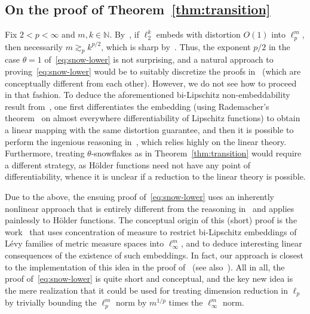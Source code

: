 \documentclass[11pt,reqno]{amsart}
\newcommand{\N}{\mathbb{N}}
\newcommand{\1}{\mathbf{1}}
\begin{document}
  
\subsection{On the proof of Theorem~\ref{thm:transition}} Fix $2<p<\infty$ and $m,k\in \N$. By~\cite{PR75,BDGJN77}, if $\ell_2^k$ embeds with distortion $O(1)$ into $\ell_p^m$, then necessarily $m\gtrsim_p k^{p/2}$, which is sharp by~\cite{FLM}. Thus, the exponent $p/2$ in the case $\theta=1$ of~\eqref{eq:snow-lower} is not surprising, and a natural approach to proving~\eqref{eq:snow-lower} would be to suitably discretize the proofs in~\cite{PR75,BDGJN77} (which are conceptually different from each other). However, we do not see how to proceed in that fashion.  To deduce the aforementioned bi-Lipschitz non-embeddability result from~\cite{PR75,BDGJN77}, one first differentiates the embedding (using Rademacher's theorem~\cite{Rad19} on almost everywhere differentiability of Lipschitz functions) to obtain a linear mapping with the same distortion guarantee, and then it is possible to perform  the  ingenious  reasoning  in~\cite{PR75,BDGJN77}, which relies highly on the linear theory. Furthermore, treating $\theta$-snowflakes as in Theorem~\ref{thm:transition} would require a different strategy, as H\"older functions need not have any point of differentiability, whence it is unclear if a reduction to the linear theory is possible. 

Due to the above, the ensuing proof of~\eqref{eq:snow-lower}  uses an inherently nonlinear approach that is entirely different from the reasoning in~\cite{PR75,BDGJN77} and applies painlessly to H\"older functions.  The conceptual origin of this (short) proof is the work~\cite{RV} that uses concentration of measure to restrict bi-Lipschitz embeddings of L\'evy families of metric measure spaces into $\ell_\infty^m$, and to deduce interesting linear consequences of the existence of such embeddings.  In fact, our approach is closest to the implementation of this idea in the proof of~\cite[Proposition~4.2]{LMN} (see also~\cite{Rab08,Nao14}). All in all, the proof of~\eqref{eq:snow-lower} is quite short and conceptual, and the key new idea is the mere realization that it could be used for treating dimension reduction in $\ell_p$ by trivially bounding the $\ell_p^m$ norm by $m^{1/p}$ times the $\ell_\infty^m$ norm.     
\end{document}
